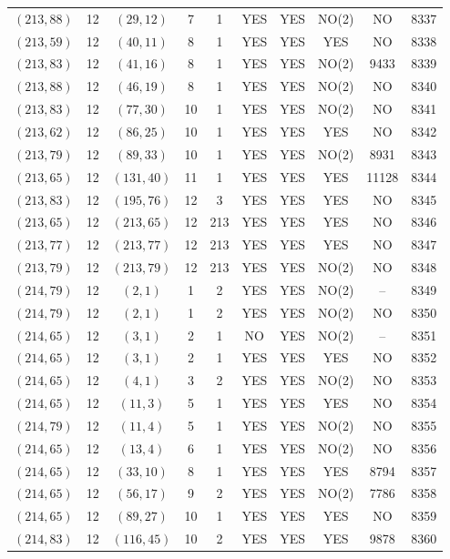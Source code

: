 \begin{longtable}{|c|c|c|c|c|c|c|c|c|c|}
$(213, 88)$ & 12 & $(29, 12)$ & 7 & 1 & YES & YES & NO(2) & NO & 8337\\
$(213, 59)$ & 12 & $(40, 11)$ & 8 & 1 & YES & YES & YES & NO & 8338\\
$(213, 83)$ & 12 & $(41, 16)$ & 8 & 1 & YES & YES & NO(2) & 9433 & 8339\\
$(213, 88)$ & 12 & $(46, 19)$ & 8 & 1 & YES & YES & NO(2) & NO & 8340\\
$(213, 83)$ & 12 & $(77, 30)$ & 10 & 1 & YES & YES & NO(2) & NO & 8341\\
$(213, 62)$ & 12 & $(86, 25)$ & 10 & 1 & YES & YES & YES & NO & 8342\\
$(213, 79)$ & 12 & $(89, 33)$ & 10 & 1 & YES & YES & NO(2) & 8931 & 8343\\
$(213, 65)$ & 12 & $(131, 40)$ & 11 & 1 & YES & YES & YES & 11128 & 8344\\
$(213, 83)$ & 12 & $(195, 76)$ & 12 & 3 & YES & YES & YES & NO & 8345\\
$(213, 65)$ & 12 & $(213, 65)$ & 12 & 213 & YES & YES & YES & NO & 8346\\
$(213, 77)$ & 12 & $(213, 77)$ & 12 & 213 & YES & YES & YES & NO & 8347\\
$(213, 79)$ & 12 & $(213, 79)$ & 12 & 213 & YES & YES & NO(2) & NO & 8348\\
$(214, 79)$ & 12 & $(2, 1)$ & 1 & 2 & YES & YES & NO(2) & -- & 8349\\
$(214, 79)$ & 12 & $(2, 1)$ & 1 & 2 & YES & YES & NO(2) & NO & 8350\\
$(214, 65)$ & 12 & $(3, 1)$ & 2 & 1 & NO & YES & NO(2) & -- & 8351\\
$(214, 65)$ & 12 & $(3, 1)$ & 2 & 1 & YES & YES & YES & NO & 8352\\
$(214, 65)$ & 12 & $(4, 1)$ & 3 & 2 & YES & YES & NO(2) & NO & 8353\\
$(214, 65)$ & 12 & $(11, 3)$ & 5 & 1 & YES & YES & YES & NO & 8354\\
$(214, 79)$ & 12 & $(11, 4)$ & 5 & 1 & YES & YES & NO(2) & NO & 8355\\
$(214, 65)$ & 12 & $(13, 4)$ & 6 & 1 & YES & YES & NO(2) & NO & 8356\\
$(214, 65)$ & 12 & $(33, 10)$ & 8 & 1 & YES & YES & YES & 8794 & 8357\\
$(214, 65)$ & 12 & $(56, 17)$ & 9 & 2 & YES & YES & NO(2) & 7786 & 8358\\
$(214, 65)$ & 12 & $(89, 27)$ & 10 & 1 & YES & YES & YES & NO & 8359\\
$(214, 83)$ & 12 & $(116, 45)$ & 10 & 2 & YES & YES & YES & 9878 & 8360\\

\end{longtable}
